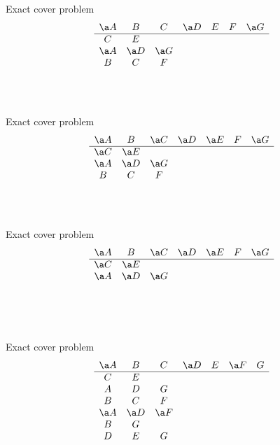 \documentclass[xcolor=svgnames]{beamer}
\begin{document}
%
\begin{frame}{Exact cover problem} 
\Large\boldmath
  $$
  \begin{array}{ccccccc}
    \a A & B & C & \a D & E & F & \a G\\
    \hline
    C & E &&&&&\\
    \a A & \a D & \a G &&&&\\
    B & C & F &&&&\\
    &&&&&&\\
    &&&&&&\\
    &&&&&&
  \end{array}
  $$
\end{frame}

%
\begin{frame}{Exact cover problem} 
\Large\boldmath
  $$
  \begin{array}{ccccccc}
    \a A & B & \a C & \a D & \a E & F & \a G\\
    \hline
    \a C & \a E &&&&&\\
    \a A & \a D & \a G &&&&\\
    B & C & F &&&&\\
    &&&&&&\\
    &&&&&&\\
    &&&&&&
  \end{array}
  $$
\end{frame}

%
\begin{frame}{Exact cover problem} 
\Large\boldmath
  $$
  \begin{array}{ccccccc}
    \a A & B & \a C & \a D & \a E & F & \a G\\
    \hline
    \a C & \a E &&&&&\\
    \a A & \a D & \a G &&&&\\
    &&&&&&\\
    &&&&&&\\
    &&&&&&\\
    &&&&&&
  \end{array}
  $$
\end{frame}

%
\begin{frame}{Exact cover problem} 
\Large\boldmath
  $$
  \begin{array}{ccccccc}
    \a A & B & C & \a D & E & \a F & G\\
    \hline
    C & E &&&&&\\
    A & D & G &&&&\\
    B & C & F &&&&\\
    \a A & \a D & \a F &&&&\\
    B & G &&&&&\\
    D & E & G &&&&
  \end{array}
  $$
\end{frame}
\end{document}
